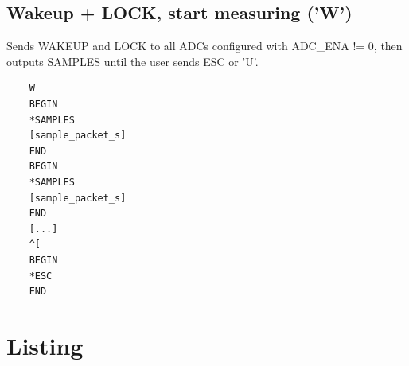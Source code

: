 \documentclass{article}
\begin{document}
\subsection{Wakeup + LOCK, start measuring ('W')}

Sends WAKEUP and LOCK to all ADCs configured with ADC\_ENA != 0,
then outputs SAMPLES until the user sends ESC or 'U'.

\begin{lstlisting}
    W
    BEGIN
    *SAMPLES
    [sample_packet_s]
    END
    BEGIN
    *SAMPLES
    [sample_packet_s]
    END
    [...]
    ^[
    BEGIN
    *ESC
    END
\end{lstlisting}


\section{Listing}
\label{sample_packet_s}


\end{document}
